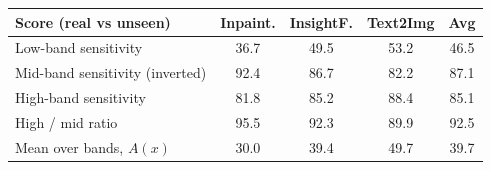 \begin{tabular}{@{}lcccc@{}}
\toprule
Score (real vs unseen) & Inpaint. & InsightF. & Text2Img & Avg \\
\midrule
Low-band sensitivity & 36.7 & 49.5 & 53.2 & 46.5 \\
Mid-band sensitivity (inverted) & 92.4 & 86.7 & 82.2 & 87.1 \\
High-band sensitivity & 81.8 & 85.2 & 88.4 & 85.1 \\
High / mid ratio & 95.5 & 92.3 & 89.9 & 92.5 \\
Mean over bands, $A(x)$ & 30.0 & 39.4 & 49.7 & 39.7 \\
\bottomrule
\end{tabular}
